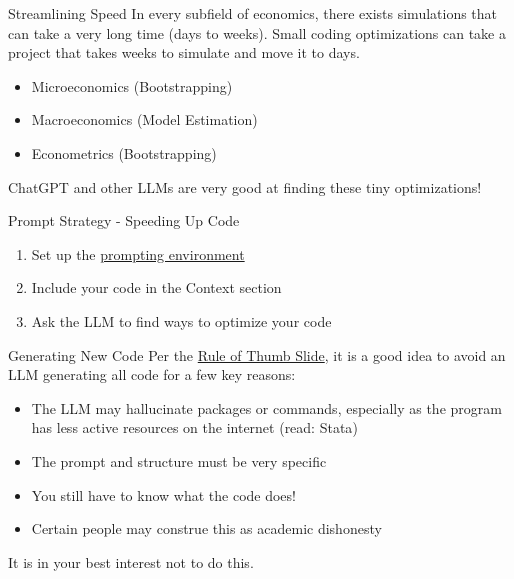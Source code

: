 \documentclass[aspectratio=43]{beamer}
\begin{document}
\begin{frame}{Streamlining Speed}
    In every subfield of economics, there exists simulations that can take a very long time (days to weeks). Small coding optimizations can take a project that takes weeks to simulate and move it to days. 
    \begin{itemize}
        \item Microeconomics (Bootstrapping)
        \item Macroeconomics (Model Estimation)
        \item Econometrics (Bootstrapping)
    \end{itemize}
    \bigbreak 
    ChatGPT and other LLMs are very good at finding these tiny optimizations! 
\end{frame}
\begin{frame}{Prompt Strategy - Speeding Up Code}
    \begin{enumerate}
        \item Set up the \hyperlink{Prompt Structure}{prompting environment}
        \item Include your code in the \alert{Context} section
        \item Ask the LLM to find ways to optimize your code
    \end{enumerate}
\end{frame}
\begin{frame}{Generating New Code}
    Per the \hyperlink{Rule of Thumb}{Rule of Thumb Slide}, it is a good idea to avoid an LLM generating all code for a few key reasons:
    \begin{itemize}
        \item The LLM may hallucinate packages or commands, especially as the program has less active resources on the internet (read: \alert{Stata}) 
        \item The prompt and structure must be very specific
        \item You still have to know what the code does! 
        \item Certain people may construe this as academic dishonesty
    \end{itemize}
    \alert{It is in your best interest not to do this.}
\end{frame}
\end{document}
